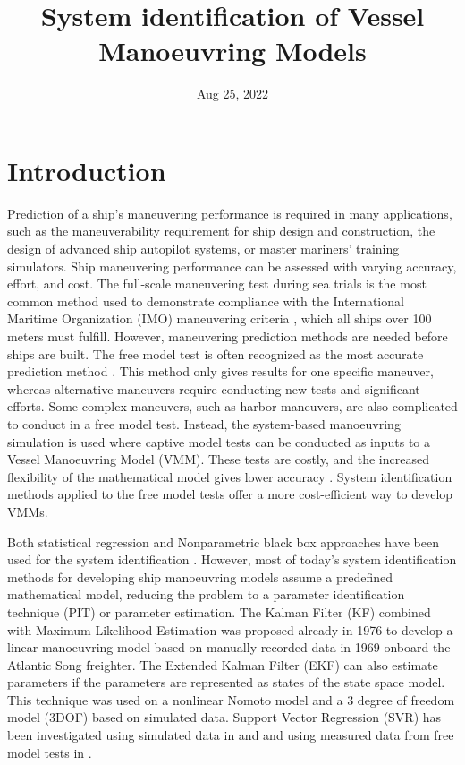 \documentclass[review]{elsarticle}
\title{System identification of Vessel Manoeuvring Models}
\date{Aug 25, 2022}
\begin{document}



\pagestyle{empty}

\pagestyle{plain}

\pagestyle{normal}
\label{\detokenize{index::doc}}



\section{Introduction}
\label{\detokenize{00.02_introduction:introduction}}\label{\detokenize{00.02_introduction::doc}}
% 
Prediction of a ship's maneuvering performance is required in many applications, such as the maneuverability requirement for ship design and construction, the design of advanced ship autopilot systems, or master mariners' training simulators. Ship maneuvering performance can be assessed with varying accuracy, effort, and cost. The full-scale maneuvering test during sea trials is the most common method used to demonstrate compliance with the International Maritime Organization (IMO) maneuvering criteria \cite{imo_standards_2002}, which all ships over 100 meters must fulfill. However, maneuvering prediction methods are needed before ships are built. The free model test is often recognized as the most accurate prediction method \cite{ittc_maneuvering_2008}.
This method only gives results for one specific maneuver, whereas alternative maneuvers require conducting new tests and significant efforts. Some complex maneuvers, such as harbor maneuvers, are also complicated to conduct in a free model test.
Instead, the system-based manoeuvring simulation is used where captive model tests can be conducted as inputs to a Vessel Manoeuvring Model (VMM). These tests are costly, and the increased flexibility of the mathematical model gives lower accuracy \cite{ittc_maneuvering_2008}.
System identification methods applied to the free model tests offer a more cost-efficient way to develop VMMs.

Both statistical regression and Non\sphinxhyphen{}parametric black box approaches have been used for the system identification \cite{he_nonparametric_2022}.  However, most of today's system identification methods for developing ship manoeuvring models assume a predefined mathematical model, reducing the problem to a parameter identification technique (PIT) or parameter estimation.
The Kalman Filter (KF) combined with Maximum Likelihood Estimation was proposed already in 1976 \cite{astrom_identification_1976} to develop a linear manoeuvring model based on manually recorded data in 1969 onboard the Atlantic Song freighter. The Extended Kalman Filter (EKF) can also estimate parameters if the parameters are represented as states of the state space model. This technique was used on a nonlinear Nomoto model \cite{perera_system_2015} and a 3 degree of freedom model (3DOF) \cite{shi_identification_2009} based on simulated data.
Support Vector Regression (SVR) has been investigated using simulated data in \cite{zhu_parameter_2017} and \cite{wang_parameter_2021} and using measured data from free model tests in \cite{luo_parameter_2016}.
\end{document}
